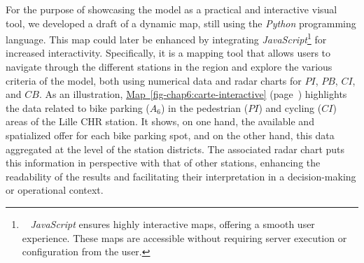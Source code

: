 \begin{refsegment}
For the purpose of showcasing the model as a practical and interactive visual tool, we developed a draft of a dynamic map, still using the \textsl{Python} programming language. This map could later be enhanced by integrating \textsl{JavaScript}\footnote{~
    \textsl{JavaScript} ensures highly interactive maps, offering a smooth user experience. These maps are accessible without requiring server execution or configuration from the user.
} for increased interactivity. Specifically, it is a mapping tool that allows users to navigate through the different stations in the region and explore the various criteria of the model, both using numerical data and radar charts for \(PI\), \(PB\), \(CI\), and \(CB\). As an illustration, \hyperref[fig-chap6:carte-interactive]{Map~\ref{fig-chap6:carte-interactive}} (page~\pageref{fig-chap6:carte-interactive}) highlights the data related to bike parking (\(A_{6}\)) in the pedestrian (\(PI\)) and cycling (\(CI\)) areas of the Lille CHR station. It shows, on one hand, the available and spatialized offer for each bike parking spot, and on the other hand, this data aggregated at the level of the station districts. The associated radar chart puts this information in perspective with that of other stations, enhancing the readability of the results and facilitating their interpretation in a decision-making or operational context.


\end{refsegment}
